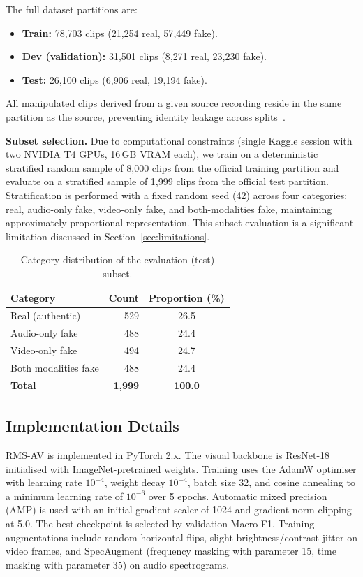 \documentclass[conference]{IEEEtran}
\begin{document}
The full dataset partitions are:
\begin{itemize}
    \item \textbf{Train:} 78{,}703 clips (21{,}254 real, 57{,}449 fake).
    \item \textbf{Dev (validation):} 31{,}501 clips (8{,}271 real, 23{,}230 fake).
    \item \textbf{Test:} 26{,}100 clips (6{,}906 real, 19{,}194 fake).
\end{itemize}
All manipulated clips derived from a given source recording reside in the same partition as the source, preventing identity leakage across splits~\cite{cai2022lavdf}.

\textbf{Subset selection.} Due to computational constraints (single Kaggle session with two NVIDIA T4 GPUs, 16\,GB VRAM each), we train on a deterministic stratified random sample of 8{,}000 clips from the official training partition and evaluate on a stratified sample of 1{,}999 clips from the official test partition. Stratification is performed with a fixed random seed (42) across four categories: real, audio-only fake, video-only fake, and both-modalities fake, maintaining approximately proportional representation. This subset evaluation is a significant limitation discussed in Section~\ref{sec:limitations}.

\begin{table}[t]
\centering
\caption{Category distribution of the evaluation (test) subset.}
\label{tab:eval_distribution}
\begin{tabular}{lrc}
\toprule
\textbf{Category} & \textbf{Count} & \textbf{Proportion (\%)} \\
\midrule
Real (authentic)         & 529 & 26.5 \\
Audio-only fake          & 488 & 24.4 \\
Video-only fake          & 494 & 24.7 \\
Both modalities fake     & 488 & 24.4 \\
\midrule
\textbf{Total}           & \textbf{1{,}999} & \textbf{100.0} \\
\bottomrule
\end{tabular}
\end{table}

\subsection{Implementation Details}

RMS-AV is implemented in PyTorch 2.x. The visual backbone is ResNet-18 initialised with ImageNet-pretrained weights. Training uses the AdamW optimiser with learning rate $10^{-4}$, weight decay $10^{-4}$, batch size 32, and cosine annealing to a minimum learning rate of $10^{-6}$ over 5 epochs. Automatic mixed precision (AMP) is used with an initial gradient scaler of 1024 and gradient norm clipping at 5.0. The best checkpoint is selected by validation Macro-F1. Training augmentations include random horizontal flips, slight brightness/contrast jitter on video frames, and SpecAugment (frequency masking with parameter 15, time masking with parameter 35) on audio spectrograms.
\end{document}
